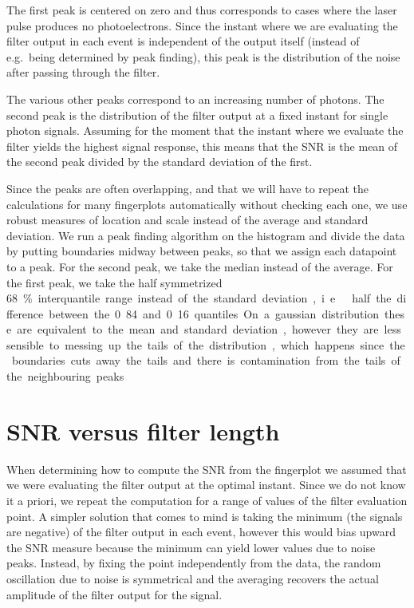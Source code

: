 The first peak is centered on zero and thus corresponds to cases where the
laser pulse produces no photoelectrons. Since the instant where we are
evaluating the filter output in each event is independent of the output itself
(instead of e.g.\ being determined by peak finding), this peak is the
distribution of the noise after passing through the filter.

The various other peaks correspond to an increasing number of photons. The
second peak is the distribution of the filter output at a fixed instant for
single photon signals. Assuming for the moment that the instant where we
evaluate the filter yields the highest signal response, this means that the SNR
is the mean of the second peak divided by the standard deviation of the first.

Since the peaks are often overlapping, and that we will have to repeat the
calculations for many fingerplots automatically without checking each one, we
use robust measures of location and scale instead of the average and standard
deviation. We run a peak finding algorithm on the histogram and divide the data
by putting boundaries midway between peaks, so that we assign each datapoint to
a peak. For the second peak, we take the median instead of the average. For the
first peak, we take the half symmetrized \SI{68}\% interquantile range instead
of the standard deviation, i.e.\ half the difference between the 0.84 and 0.16
quantiles. On a gaussian distribution these are equivalent to the mean and
standard deviation, however they are less sensible to messing up the tails of
the distribution, which happens since the boundaries cuts away the tails and
there is contamination from the tails of the neighbouring peaks.


\section{SNR versus filter length}

When determining how to compute the SNR from the fingerplot we assumed that we
were evaluating the filter output at the optimal instant. Since we do not know
it a priori, we repeat the computation for a range of values of the filter
evaluation point. A simpler solution that comes to mind is taking the minimum
(the signals are negative) of the filter output in each event, however this
would bias upward the SNR measure because the minimum can yield lower values
due to noise peaks. Instead, by fixing the point independently from the data,
the random oscillation due to noise is symmetrical and the averaging recovers
the actual amplitude of the filter output for the signal.

